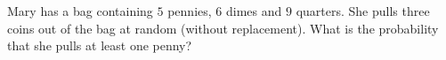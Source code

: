 Mary has a bag containing $5$ pennies, $6$ dimes and $9$ quarters. She pulls three coins out of the bag at random (without replacement). What is the probability that she pulls at least one penny?
